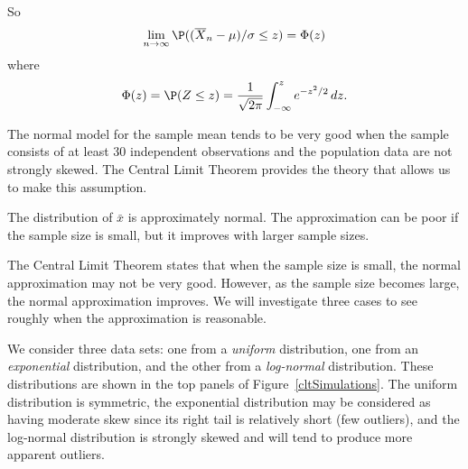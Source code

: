 So
\[
	\lim_{n\to\infty} \P((\overline X_n-\mu)/\sigma\le z) = \Phi(z)
\]
where
\[
	\Phi(z)=\P(Z\le z)=\frac1{\sqrt{2\pi}}\int_{-\infty}^z e^{-z^2/2}\,dz.
\]

The normal model for the sample mean tends to be very good when the sample consists of at least 30 independent observations and the population data are not strongly skewed. The Central Limit Theorem provides the theory that allows us to make this assumption.

\begin{termBox}{
The distribution of $\bar{x}$ is approximately normal. The approximation can be poor if the sample size is small, but it improves with larger sample sizes.}
\end{termBox}

The Central Limit Theorem states that when the sample size is small, the normal approximation may not be very good. However, as the sample size becomes large, the normal approximation improves. We will investigate three cases to see roughly when the approximation is reasonable.

We consider three data sets: one from a \emph{uniform} distribution, one from an \emph{exponential} distribution, and the other from a \emph{log-normal} distribution. These distributions are shown in the top panels of Figure~\ref{cltSimulations}. The uniform distribution is symmetric, the exponential distribution may be considered as having moderate skew since its right tail is relatively short (few outliers), and the log-normal distribution is strongly skewed and will tend to produce more apparent outliers.

